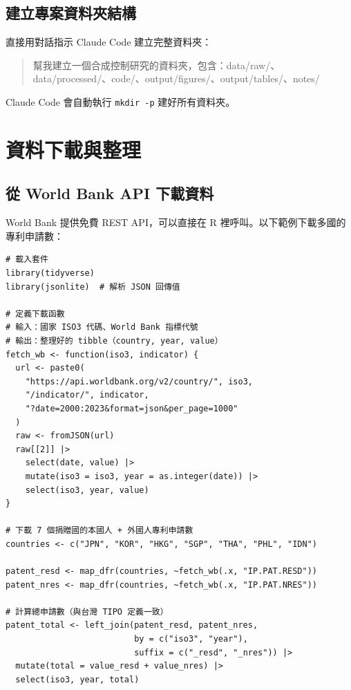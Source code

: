 \documentclass[12pt, a4paper]{article}
\begin{document}
\subsection{建立專案資料夾結構}

直接用對話指示 Claude Code 建立完整資料夾：

\begin{quote}
幫我建立一個合成控制研究的資料夾，包含：data/raw/、data/processed/、code/、output/figures/、output/tables/、notes/
\end{quote}

Claude Code 會自動執行 \texttt{mkdir -p} 建好所有資料夾。

\section{資料下載與整理}

\subsection{從 World Bank API 下載資料}

World Bank 提供免費 REST API，可以直接在 R 裡呼叫。以下範例下載多國的專利申請數：

\begin{lstlisting}
# 載入套件
library(tidyverse)
library(jsonlite)  # 解析 JSON 回傳值

# 定義下載函數
# 輸入：國家 ISO3 代碼、World Bank 指標代號
# 輸出：整理好的 tibble（country, year, value）
fetch_wb <- function(iso3, indicator) {
  url <- paste0(
    "https://api.worldbank.org/v2/country/", iso3,
    "/indicator/", indicator,
    "?date=2000:2023&format=json&per_page=1000"
  )
  raw <- fromJSON(url)
  raw[[2]] |>
    select(date, value) |>
    mutate(iso3 = iso3, year = as.integer(date)) |>
    select(iso3, year, value)
}

# 下載 7 個捐贈國的本國人 + 外國人專利申請數
countries <- c("JPN", "KOR", "HKG", "SGP", "THA", "PHL", "IDN")

patent_resd <- map_dfr(countries, ~fetch_wb(.x, "IP.PAT.RESD"))
patent_nres <- map_dfr(countries, ~fetch_wb(.x, "IP.PAT.NRES"))

# 計算總申請數（與台灣 TIPO 定義一致）
patent_total <- left_join(patent_resd, patent_nres,
                          by = c("iso3", "year"),
                          suffix = c("_resd", "_nres")) |>
  mutate(total = value_resd + value_nres) |>
  select(iso3, year, total)
\end{lstlisting}
\end{document}
